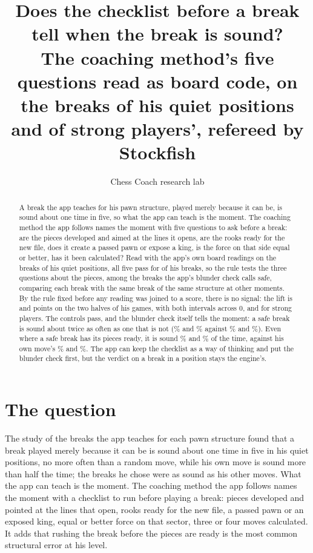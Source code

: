 \documentclass[11pt]{article}
\title{Does the checklist before a break tell when the break is sound?\\[0.3em]
\large The coaching method's five questions read as board code, on the \BreaksAll{} breaks of
his quiet positions and \StrongBreaks{} of strong players', refereed by Stockfish}
\author{Chess Coach research lab}
\date{}
\begin{document}
\maketitle

\begin{abstract}
A break the app teaches for his pawn structure, played merely because it can be, is sound about
one time in five, so what the app can teach is the moment. The coaching method the app follows
names the moment with five questions to ask before a break: are the pieces developed and aimed at
the lines it opens, are the rooks ready for the new file, does it create a passed pawn or expose
a king, is the force on that side equal or better, has it been calculated? Read with the app's
own board readings on the breaks of his quiet positions, all five pass for \AllFive{} of his
\BreaksAll{} breaks, so the rule tests the three questions about the pieces, among the breaks the
app's blunder check calls safe, comparing each break with the same break of the same structure at
other moments. By the rule fixed before any reading was joined to a score, there is no signal:
the lift is \LiftFirst{} and \LiftSecond{} points on the two halves of his games, with both
intervals across 0, and \StrongLift{} for strong players. The controls pass, and the blunder
check itself tells the moment: a safe break is sound about twice as often as one that is not
(\SafeSoundFirst\% and \SafeSoundSecond\% against \UnsafeSoundFirst\% and \UnsafeSoundSecond\%).
Even where a safe break has its pieces ready, it is sound \AgainstReadyFirst\% and
\AgainstReadySecond\% of the time, against his own move's \AgainstOwnFirst\% and
\AgainstOwnSecond\%. The app can keep the checklist as a way of thinking and put the blunder check
first, but the verdict on a break in a position stays the engine's.
\end{abstract}

\section{The question}

The study of the breaks the app teaches for each pawn structure found that a break played merely
because it can be is sound about one time in five in his quiet positions, no more often than a
random move, while his own move is sound more than half the time; the breaks he chose were as
sound as his other moves. What the app can teach is the moment. The coaching method the app
follows names the moment with a checklist to run before playing a break: pieces developed and
pointed at the lines that open, rooks ready for the new file, a passed pawn or an exposed king,
equal or better force on that sector, three or four moves calculated. It adds that rushing the
break before the pieces are ready is the most common structural error at his level.
\end{document}
